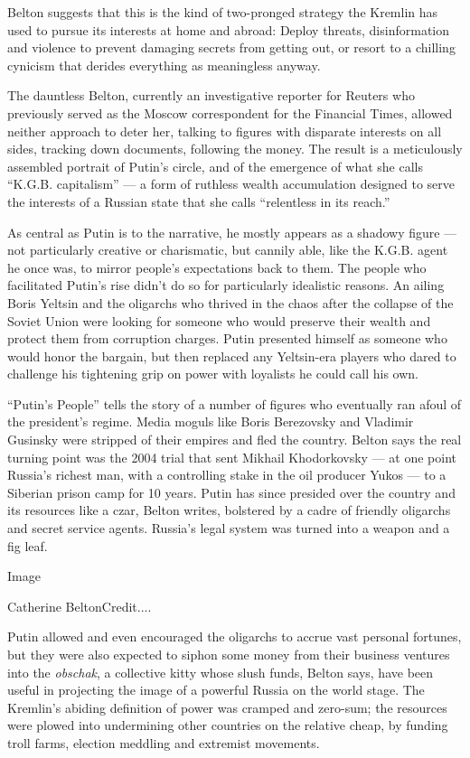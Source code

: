 Belton suggests that this is the kind of two-pronged strategy the
Kremlin has used to pursue its interests at home and abroad: Deploy
threats, disinformation and violence to prevent damaging secrets from
getting out, or resort to a chilling cynicism that derides everything as
meaningless anyway.

The dauntless Belton, currently an investigative reporter for Reuters
who previously served as the Moscow correspondent for the Financial
Times, allowed neither approach to deter her, talking to figures with
disparate interests on all sides, tracking down documents, following the
money. The result is a meticulously assembled portrait of Putin's
circle, and of the emergence of what she calls ``K.G.B. capitalism'' ---
a form of ruthless wealth accumulation designed to serve the interests
of a Russian state that she calls ``relentless in its reach.''

As central as Putin is to the narrative, he mostly appears as a shadowy
figure --- not particularly creative or charismatic, but cannily able,
like the K.G.B. agent he once was, to mirror people's expectations back
to them. The people who facilitated Putin's rise didn't do so for
particularly idealistic reasons. An ailing Boris Yeltsin and the
oligarchs who thrived in the chaos after the collapse of the Soviet
Union were looking for someone who would preserve their wealth and
protect them from corruption charges. Putin presented himself as someone
who would honor the bargain, but then replaced any Yeltsin-era players
who dared to challenge his tightening grip on power with loyalists he
could call his own.

``Putin's People'' tells the story of a number of figures who eventually
ran afoul of the president's regime. Media moguls like Boris Berezovsky
and Vladimir Gusinsky were stripped of their empires and fled the
country. Belton says the real turning point was the 2004 trial that sent
Mikhail Khodorkovsky --- at one point Russia's richest man, with a
controlling stake in the oil producer Yukos --- to a Siberian prison
camp for 10 years. Putin has since presided over the country and its
resources like a czar, Belton writes, bolstered by a cadre of friendly
oligarchs and secret service agents. Russia's legal system was turned
into a weapon and a fig leaf.

Image

Catherine BeltonCredit....

Putin allowed and even encouraged the oligarchs to accrue vast personal
fortunes, but they were also expected to siphon some money from their
business ventures into the \emph{obschak}, a collective kitty whose
slush funds, Belton says, have been useful in projecting the image of a
powerful Russia on the world stage. The Kremlin's abiding definition of
power was cramped and zero-sum; the resources were plowed into
undermining other countries on the relative cheap, by funding troll
farms, election meddling and extremist movements.

